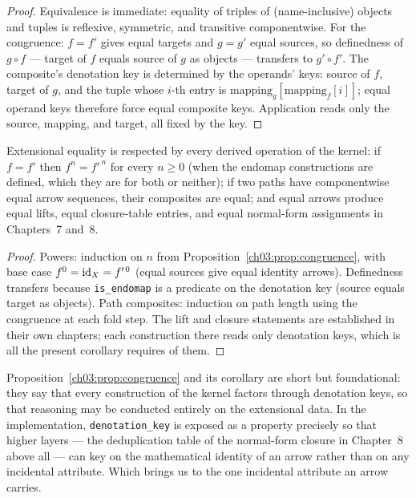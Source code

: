\begin{proof}
Equivalence is immediate: equality of triples of (name-inclusive) objects
and tuples is reflexive, symmetric, and transitive componentwise.
For the congruence: $f = f'$ gives equal targets and $g = g'$ equal
sources, so definedness of $g \circ f$ --- target of $f$ equals source of
$g$ as objects --- transfers to $g' \circ f'$. The composite's denotation
key is determined by the operands' keys: source of $f$, target of $g$,
and the tuple whose $i$-th entry is
$\mathrm{mapping}_g[\mathrm{mapping}_f[i]]$; equal operand keys therefore
force equal composite keys. Application reads only the source, mapping,
and target, all fixed by the key.
\end{proof}

\begin{corollary}\label{ch03:cor:derived-congruence}
Extensional equality is respected by every derived operation of the
kernel: if $f = f'$ then $f^{n} = f'^{\,n}$ for every $n \geq 0$ (when
the endomap constructions are defined, which they are for both or
neither); if two paths have componentwise equal arrow sequences, their
composites are equal; and equal arrows produce equal lifts, equal
closure-table entries, and equal normal-form assignments in
Chapters~7 and~8.
\end{corollary}

\begin{proof}
Powers: induction on $n$ from Proposition~\ref{ch03:prop:congruence},
with base case $f^{0} = \mathrm{id}_X = f'^{\,0}$ (equal sources give equal
identity arrows). Definedness transfers because \texttt{is\_endomap} is
a predicate on the denotation key (source equals target as objects).
Path composites: induction on path length using the congruence at each
fold step. The lift and closure statements are established in their own
chapters; each construction there reads only denotation keys, which is
all the present corollary requires of them.
\end{proof}

Proposition~\ref{ch03:prop:congruence} and its corollary are short but
foundational: they say that every construction of the kernel factors
through denotation keys, so that reasoning may be conducted entirely on
the extensional data. In the implementation, \texttt{denotation\_key} is
exposed as a property precisely so that higher layers --- the
deduplication table of the normal-form closure in Chapter~8 above all
--- can key on the mathematical identity of an arrow rather than on any
incidental attribute. Which brings us to the one incidental attribute an
arrow carries.

